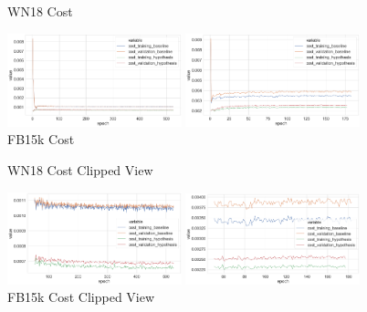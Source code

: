 \begin{figure}[H]
	\parbox{.5\linewidth}{
   		\caption{WN18 Cost}
   		\centering
    		\includegraphics[width=0.45\textwidth, height=0.2\textheight]{WN18_Cost_Results}
		}
	\hfill
	\parbox{.5\linewidth}{
		\caption{FB15k Cost}
   		\centering
		\includegraphics[width=0.45\textwidth, height=0.2\textheight]{FB15k_Cost_Results}
		}
\end{figure}

\begin{figure}[H]
	\parbox{.5\linewidth}{
   		\caption{WN18 Cost Clipped View}
   		\centering
    		\includegraphics[width=0.45\textwidth, height=0.2\textheight]{WN18_Cost_Results_Clipped}
		}
	\hfill
	\parbox{.5\linewidth}{
		\caption{FB15k Cost Clipped View}
   		\centering
		\includegraphics[width=0.45\textwidth, height=0.2\textheight]{FB15k_Cost_Results_Clipped}
		}
\end{figure}


